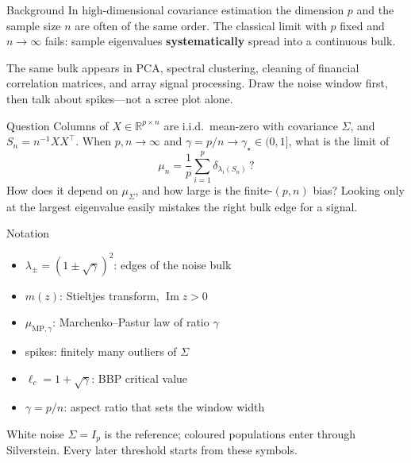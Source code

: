 \documentclass{article}
\begin{document}
\makeposterbanner
\begin{postercolumns}

\begin{postercolumn}

\begin{posterblock}{Background}
  In high-dimensional covariance estimation the dimension $p$ and the sample
  size $n$ are often of the same order. The classical limit with $p$ fixed
  and $n\to\infty$ fails: sample eigenvalues \textbf{systematically} spread
  into a continuous bulk.

  The same bulk appears in PCA, spectral clustering, cleaning of financial
  correlation matrices, and array signal processing. Draw the noise window
  first, then talk about spikes---not a scree plot alone.
\end{posterblock}

\posterblockgap

\begin{posterblock}{Question}
  Columns of $X\in\mathbb{R}^{p\times n}$ are i.i.d.\ mean-zero with covariance
  $\Sigma$, and $S_n=n^{-1}XX^\top$. When $p,n\to\infty$ and
  $\gamma=p/n\to\gamma_\star\in(0,1]$, what is the limit of
  \[
    \mu_n=\frac1p\sum_{i=1}^p \delta_{\lambda_i(S_n)}\,?
  \]
  How does it depend on $\mu_\Sigma$, and how large is the finite-$(p,n)$ bias?
  Looking only at the largest eigenvalue easily mistakes the right bulk edge
  for a signal.
\end{posterblock}

\posterblockgap

\begin{posterblock}[posterquiet]{Notation}
  \begin{itemize}
    \item $\lambda_\pm=(1\pm\sqrt{\gamma})^2$: edges of the noise bulk
    \item $m(z)$: Stieltjes transform, $\operatorname{Im}z>0$
    \item $\mu_{\mathrm{MP},\gamma}$: Marchenko--Pastur law of ratio $\gamma$
    \item spikes: finitely many outliers of $\Sigma$
    \item $\ell_c=1+\sqrt{\gamma}$: BBP critical value
    \item $\gamma=p/n$: aspect ratio that sets the window width
  \end{itemize}
  White noise $\Sigma=I_p$ is the reference; coloured populations enter through
  Silverstein. Every later threshold starts from these symbols.
\end{posterblock}
\end{postercolumn}


\end{postercolumns}
\end{document}
